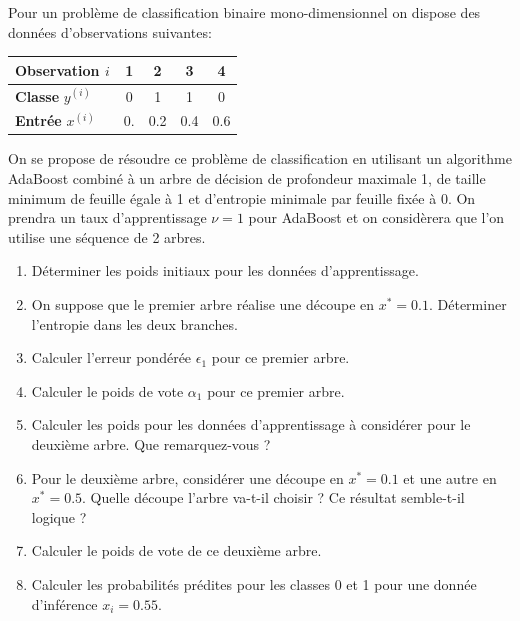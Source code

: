 \documentclass[solutions]{../exercices}
\begin{document}
	\begin{exercice}
		Pour un problème de classification binaire mono-dimensionnel on dispose des données d'observations suivantes:
		
		\begin{table}[h]
			\centering
			\begin{tabular}{|l|c|c|c|c|}
				\hline
				\textbf{Observation} $i$ & 1 & 2 & 3 & 4 \\
				\hline
				\textbf{Classe} $y^{(i)}$ & 0 & 1 & 1 & 0 \\
				\hline
				\textbf{Entrée} $x^{(i)}$ & 0. & 0.2 & 0.4 & 0.6 \\
				\hline
			\end{tabular}
		\end{table}
		
		On se propose de résoudre ce problème de classification en utilisant un algorithme AdaBoost combiné à un arbre de décision de profondeur maximale 1, de taille minimum de feuille égale à 1 et d'entropie minimale par feuille fixée à 0. On prendra un taux d'apprentissage $\nu = 1$ pour AdaBoost et on considèrera que l'on utilise une séquence de 2 arbres.
		
		\begin{enumerate}
			\item Déterminer les poids initiaux pour les données d'apprentissage.
			\item On suppose que le premier arbre réalise une découpe en $x^* = 0.1$. Déterminer l'entropie dans les deux branches.
			\item Calculer l'erreur pondérée $\epsilon_1$ pour ce premier arbre.
			\item Calculer le poids de vote $\alpha_1$ pour ce premier arbre.
			\item Calculer les poids pour les données d'apprentissage à considérer pour le deuxième arbre. Que remarquez-vous ?
			\item Pour le deuxième arbre, considérer une découpe en $x^*=0.1$ et une autre en $x^*=0.5$. Quelle découpe l'arbre va-t-il choisir ? Ce résultat semble-t-il logique ?
			\item Calculer le poids de vote de ce deuxième arbre.
			\item Calculer les probabilités prédites pour les classes 0 et 1 pour une donnée d'inférence $x_i = 0.55$.
			
		\end{enumerate}
	\end{exercice}
	
\end{document}
